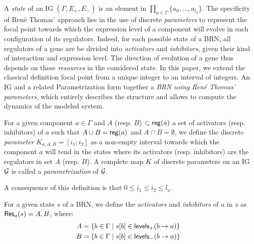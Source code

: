 A \emph{state} of an IG $(\Gamma, E_+, E_-)$ is an element in $\prod_{a \in \Gamma} \{a_0, \dots, a_{l_a}\}$.
The specificity of René Thomas' approach lies in the use of discrete \emph{parameters} to represent the focal point towards which the expression level of a component will evolve in each configuration of its regulators.
Indeed, for each possible state of a BRN, all regulators of a gene are be divided into \emph{activators} and \emph{inhibitors}, given their kind of interaction and expression level.
The direction of evolution of a gene thus depends on these \emph{resources} in the considered state.
In this paper, we extend the classical definition focal point from a unique integer to an interval of integers.
An IG and a related Parametrization form together a \emph{BRN using René Thomas' parameters}, which entirely describes the structure and allows to compute the dynamics of the modeled system.

\begin{definition}\label{def:param}
For a given component $a \in \Gamma$ and $A$ (resp. $B$) $\subset \mathsf{reg}({a})$ a set of activators (resp. inhibitors) of $a$ such that
$A \cup B = \mathsf{reg}({a})$ and $A \cap B = \emptyset$,
we define the discrete \emph{parameter} $K_{a,A,B} = [i_1; i_2]$ as a non-empty interval towards which the component $a$ will tend
in the states where its activators (resp. inhibitors) are the regulators in set $A$ (resp. $B$).
A complete map $K$ of discrete parameters on an IG $\mathcal{G}$ is called a \emph{parametrization} of $\mathcal{G}$.
\end{definition}
A consequence of this definition is that $0 \leq i_1 \leq i_2 \leq l_a$.

\begin{definition}\label{def:resources}
For a given state $s$ of a BRN, we define the \emph{activators} and \emph{inhibitors} of $a$ in $s$ as $\mathsf{Res}_{a}(s) = A,B$, where:
\begin{align*}
  A &= \{b \in \Gamma \mid {s[b]} \in \mathsf{levels}_+(b\rightarrow a)\} \\
  B &= \{b \in \Gamma \mid {s[b]} \in \mathsf{levels}_-(b\rightarrow a)\}
\end{align*}
\end{definition}

